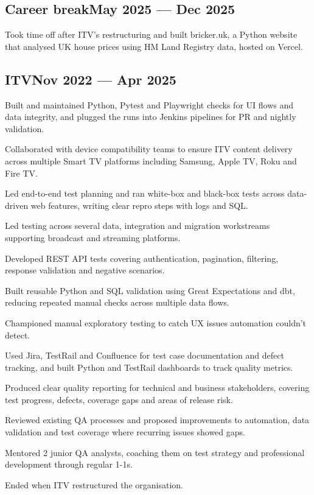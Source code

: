 \subsection{{Career break\hfill May 2025 --- Dec 2025}}
\begin{zitemize}
  \item Took time off after ITV's restructuring and built bricker.uk, a Python website that analysed UK house prices using HM Land Registry data, hosted on Vercel.
\end{zitemize}

\subsection{{ITV\hfill Nov 2022 --- Apr 2025}}
\begin{zitemize}
  \item Built and maintained Python, Pytest and Playwright checks for UI flows and data integrity, and plugged the runs into Jenkins pipelines for PR and nightly validation.
  \item Collaborated with device compatibility teams to ensure ITV content delivery across multiple Smart TV platforms including Samsung, Apple TV, Roku and Fire TV.
  \item Led end-to-end test planning and ran white-box and black-box tests across data-driven web features, writing clear repro steps with logs and SQL.
  \item Led testing across several data, integration and migration workstreams supporting broadcast and streaming platforms.
  \item Developed REST API tests covering authentication, pagination, filtering, response validation and negative scenarios.
  \item Built reusable Python and SQL validation using Great Expectations and dbt, reducing repeated manual checks across multiple data flows.
  \item Championed manual exploratory testing to catch UX issues automation couldn't detect.
  \item Used Jira, TestRail and Confluence for test case documentation and defect tracking, and built Python and TestRail dashboards to track quality metrics.
  \item Produced clear quality reporting for technical and business stakeholders, covering test progress, defects, coverage gaps and areas of release risk.
  \item Reviewed existing QA processes and proposed improvements to automation, data validation and test coverage where recurring issues showed gaps.
  \item Mentored 2 junior QA analysts, coaching them on test strategy and professional development through regular 1-1s.
  \item Ended when ITV restructured the organisation.
\end{zitemize}

